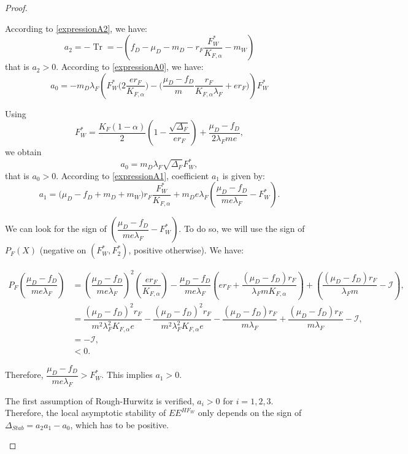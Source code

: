 \documentclass{article}
\newcommand{\lfw}{\lambda_{F}}
\newcommand{\lfw}{\lambda_{F}}
\newcommand{\cI}{\mathcal{I}}
\DeclareMathOperator{\Tr}{Tr}
\begin{document}
\begin{proof}
\begin{itemize}
According to \eqref{expressionA2}, we have:
\begin{equation*}
a_2 = - \Tr = -(f_D - \mu_D - m_D - r_F \dfrac{F_W^*}{K_{F, \alpha}} - m_W)
\end{equation*}
that is $a_2>0$. According to \eqref{expressionA0}, we have:
\begin{equation*}
a_0 = - m_D \lfw \left( F_W^* \Big(2 \dfrac{e r_F}{K_{F, \alpha}} \Big) - \Big(\dfrac{\mu_D - f_D}{m} \dfrac{r_F}{K_{F, \alpha} \lfw} + er_F \Big) \right) F_W^*
\end{equation*}

Using
\begin{equation*}
F_W^* = \dfrac{K_F(1-\alpha)}{2}\left(1 - \dfrac{\sqrt{\Delta_F}}{er_F}\right) + \dfrac{\mu_D - f_D}{2\lfw m e},
\end{equation*}
we obtain
\begin{equation*}
a_0 = m_D \lfw \sqrt{\Delta_F}  F^*_{W},
\end{equation*}
that is $a_0>0$. According to \eqref{expressionA1}, coefficient $a_1$ is given by:
\begin{equation*}
a_1 = \big( \mu_D -f_D + m_D + m_W) r_F \dfrac{F^*_W}{K_{F, \alpha}}   + m_D e\lfw   \left(\dfrac{\mu_D - f_D}{m e\lfw} - F^*_W \right).
\end{equation*}

We can look for the sign of $\left(\dfrac{\mu_D -f_D}{m e\lfw} - F^*_{W}\right)$. To do so, we will use the sign of $P_F(X)$ (negative on $(F^*_W, F^*_2)$, positive otherwise). We have:

\begin{align*}
P_F \left(\dfrac{\mu_D-f_D}{m e\lfw} \right) &= \left(\dfrac{\mu_D-f_D}{m e\lfw} \right)^2 \left(\dfrac{er_F}{K_{F, \alpha}} \right) - \dfrac{\mu_D-f_D}{m e\lfw} \left(er_F + \dfrac{(\mu_D -f_D) r_F}{\lfw m K_{F, \alpha}} \right) + \left(\dfrac{(\mu_D-f_D) r_F}{\lfw m} - \cI\right), \\
&= \dfrac{(\mu_D-f_D)^2 r_F}{m^2 \lfw^2 K_{F, \alpha} e} - \dfrac{(\mu_D-f_D)^2 r_F}{m^2 \lfw^2 K_{F, \alpha} e} - \dfrac{(\mu_D-f_D) r_F}{m \lfw} + \dfrac{(\mu_D-f_D) r_F}{m \lfw} - \cI, \\
&= - \cI,\\
& < 0.
\end{align*}

Therefore, $\dfrac{\mu_D - f_D}{m e\lfw} > F^*_{W}$. This implies $a_1 > 0$.

The first assumption of Rough-Hurwitz is verified, $a_i > 0$ for $i=1,2,3$. Therefore, the local asymptotic stability of $EE^{HF_W}$ only depends on the sign of $\Delta_{Stab}= a_2 a_1 - a_0$, which has to be positive.

\end{itemize}





\end{proof}
\end{document}

